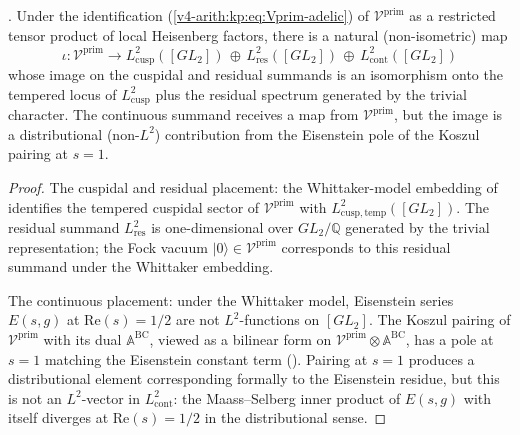 \begin{proposition}
\label{v4-arith:kms-gns:prop:Vprim-placement}
\ClaimStatusProvedHere. Under the identification
(\ref{v4-arith:kp:eq:Vprim-adelic}) of
\(\mathcal{V}^{\mathrm{prim}}\) as a restricted tensor product of
local Heisenberg factors, there is a natural (non-isometric) map
\begin{equation}
\label{v4-arith:kms-gns:eq:placement}
\iota\colon\mathcal{V}^{\mathrm{prim}}\longrightarrow L^{2}_{\mathrm{cusp}}([GL_{2}])\,\oplus\,L^{2}_{\mathrm{res}}([GL_{2}])\,\oplus\,L^{2}_{\mathrm{cont}}([GL_{2}])
\end{equation}
whose image on the cuspidal and residual summands is an isomorphism
onto the tempered locus of \(L^{2}_{\mathrm{cusp}}\) plus the residual
spectrum generated by the trivial character. The continuous summand
receives a map from \(\mathcal{V}^{\mathrm{prim}}\), but the image
is a distributional (non-\(L^{2}\)) contribution from the Eisenstein
pole of the Koszul pairing at \(s=1\).
\end{proposition}

\begin{proof}
The cuspidal and residual placement: the Whittaker-model embedding
of 
identifies the tempered cuspidal sector of
\(\mathcal{V}^{\mathrm{prim}}\) with
\(L^{2}_{\mathrm{cusp,temp}}([GL_{2}])\). The residual summand
\(L^{2}_{\mathrm{res}}\) is one-dimensional over \(GL_{2}/\mathbb{Q}\)
generated by the trivial representation; the Fock vacuum
\(|0\rangle\in\mathcal{V}^{\mathrm{prim}}\) corresponds to this
residual summand under the Whittaker embedding.

The continuous placement: under the Whittaker model, Eisenstein
series \(E(s,g)\) at \(\mathrm{Re}(s)=1/2\) are not \(L^{2}\)-functions on
\([GL_{2}]\). The Koszul pairing of \(\mathcal{V}^{\mathrm{prim}}\)
with its dual \(\mathbb{A}^{\mathrm{BC}}\), viewed as a bilinear
form on \(\mathcal{V}^{\mathrm{prim}}\otimes\mathbb{A}^{\mathrm{BC}}\),
has a pole at \(s=1\) matching the Eisenstein constant term
(). Pairing at \(s=1\) produces
a distributional element corresponding formally to the Eisenstein
residue, but this is not an \(L^{2}\)-vector in
\(L^{2}_{\mathrm{cont}}\): the Maass--Selberg inner product of
\(E(s,g)\) with itself diverges at \(\mathrm{Re}(s)=1/2\) in the
distributional sense.
\end{proof}

